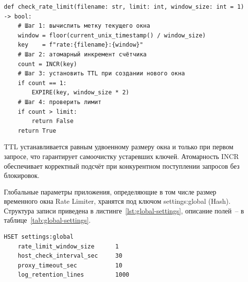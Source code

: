 \begin{listing}[H]
\caption{Псевдокод алгоритма Fixed Window Counter}
\label{lst:rate-limiter}
\begin{mdframed}
\begin{verbatim}
def check_rate_limit(filename: str, limit: int, window_size: int = 1) -> bool:
    # Шаг 1: вычислить метку текущего окна
    window = floor(current_unix_timestamp() / window_size)
    key    = f"rate:{filename}:{window}"
    # Шаг 2: атомарный инкремент счётчика
    count = INCR(key)
    # Шаг 3: установить TTL при создании нового окна
    if count == 1:
        EXPIRE(key, window_size * 2)
    # Шаг 4: проверить лимит
    if count > limit:
        return False
    return True
\end{verbatim}
\end{mdframed}
\end{listing}

TTL устанавливается равным удвоенному размеру окна и только при первом запросе, что гарантирует самоочистку устаревших ключей. Атомарность INCR~\cite{redis-incr} обеспечивает корректный подсчёт при конкурентном поступлении запросов без блокировок.

Глобальные параметры приложения, определяющие в том числе размер временного окна Rate Limiter, хранятся под ключом settings:global (Hash). Структура записи приведена в листинге~\ref{lst:global-settings}, описание полей~-- в таблице~\ref{tab:global-settings}.

\begin{listing}[H]
\caption{Структура Hash-записи глобальных настроек в Redis}
\label{lst:global-settings}
\begin{mdframed}
\begin{verbatim}
HSET settings:global
    rate_limit_window_size      1
    host_check_interval_sec     30
    proxy_timeout_sec           10
    log_retention_lines         1000
\end{verbatim}
\end{mdframed}
\end{listing}


